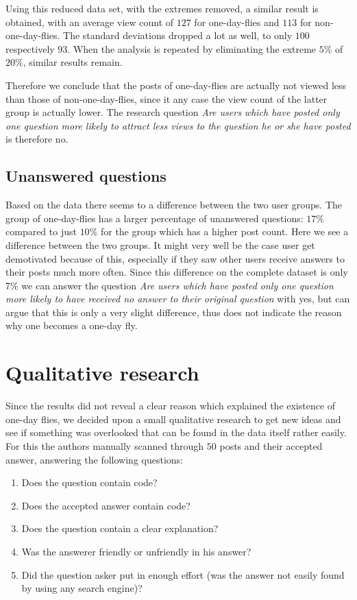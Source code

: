 \documentclass[conference]{IEEEtran}
\begin{document}
Using this reduced data set, with the extremes removed, a similar result is
obtained, with an average view count of $127$ for one-day-flies and $113$ for
non-one-day-flies. The standard deviations dropped a lot as well, to only $100$
respectively $93$. When the analysis is repeated by eliminating the extreme
$5\%$ of $20\%$, similar results remain.

Therefore we conclude that the posts of one-day-flies are actually not viewed
less than those of non-one-day-flies, since it any case the view count of the
latter group is actually lower. The research question \textit{Are users which
have posted only one question more likely to attract less views to the question
he or she have posted} is therefore no.

\subsection{Unanswered questions}

Based on the data there seems to a difference between the two user groups. The
group of one-day-flies has a larger percentage of unanswered questions: $17\%$
compared to just $10\%$ for the group which has a higher post count. Here we
see a  difference between the two groups. It might very well be the case user
get demotivated because of this, especially if they saw other users receive
answers to their posts much more often. Since this difference on the complete
dataset is only 7\% we can answer the question \textit{Are users which have
posted only one question more likely to have received no answer to their
original question} with yes, but can argue that this is only a very slight
difference, thus does not indicate the reason why one becomes a one-day fly.


\section{Qualitative research}\label{QualitativeResearch}
Since the results did not reveal a clear reason which explained the existence
of one-day flies, we decided upon a small qualitative research to get new ideas
and see if something was overlooked that can be found in the data itself rather
easily.  For this the authors manually scanned through $50$ posts and their
accepted answer, answering the following questions:

\begin{enumerate}
\item Does the question contain code?
\item Does the accepted answer contain code?
\item Does the question contain a clear explanation?
\item Was the answerer friendly or unfriendly in his answer?
\item Did the question asker put in enough effort (was the answer not easily
found by using any search engine)?  
\end{enumerate}
\end{document}
